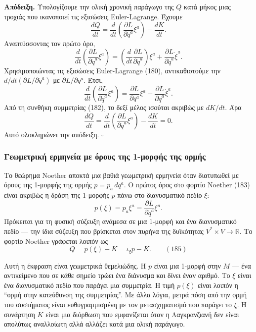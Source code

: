 \documentclass[12pt]{article}
\begin{document}
\textbf{Απόδειξη.} Υπολογίζουμε την ολική χρονική παράγωγο της $Q$ κατά μήκος μιας τροχιάς που ικανοποιεί τις εξισώσεις Euler-Lagrange. Έχουμε
\[
\frac{dQ}{dt} = \frac{d}{dt} \left( \frac{\partial L}{\partial \dot{q}^a} \xi^a \right) - \frac{dK}{dt}.
\]
Αναπτύσσοντας τον πρώτο όρο,
\[
\frac{d}{dt} \left( \frac{\partial L}{\partial \dot{q}^a} \xi^a \right) = \left( \frac{d}{dt} \frac{\partial L}{\partial \dot{q}^a} \right) \xi^a + \frac{\partial L}{\partial \dot{q}^a} \dot{\xi}^a.
\]
Χρησιμοποιώντας τις εξισώσεις Euler-Lagrange (180), αντικαθιστούμε την $d/dt (\partial L / \partial \dot{q}^a)$ με $\partial L / \partial q^a$. Έτσι,
\[
\frac{d}{dt} \left( \frac{\partial L}{\partial \dot{q}^a} \xi^a \right) = \frac{\partial L}{\partial q^a} \xi^a + \frac{\partial L}{\partial \dot{q}^a} \dot{\xi}^a.
\]
Από τη συνθήκη συμμετρίας (182), το δεξί μέλος ισούται ακριβώς με $dK/dt$. Άρα
\[
\frac{dQ}{dt} = \frac{d}{dt} \left( \frac{\partial L}{\partial \dot{q}^a} \xi^a \right) - \frac{dK}{dt} = 0.
\]
Αυτό ολοκληρώνει την απόδειξη. $\square$

\subsubsection{Γεωμετρική ερμηνεία με όρους της 1-μορφής της ορμής}

Το θεώρημα Noether αποκτά μια βαθιά γεωμετρική ερμηνεία όταν διατυπωθεί με όρους της 1-μορφής της ορμής $p = p_a \, dq^a$. Ο πρώτος όρος στο φορτίο Noether (183) είναι ακριβώς η δράση της 1-μορφής $p$ πάνω στο διανυσματικό πεδίο $\xi$:
\[
p(\xi) = p_a \xi^a = \frac{\partial L}{\partial \dot{q}^a} \xi^a.
\]
Πρόκειται για τη φυσική σύζευξη ανάμεσα σε μια 1-μορφή και ένα διανυσματικό πεδίο — την ίδια σύζευξη που βρίσκεται στον πυρήνα της δυϊκότητας $V^* \times V \to \mathbb{R}$. Το φορτίο Noether γράφεται λοιπόν ως
\begin{equation}
Q = p(\xi) - K = \iota_\xi p - K. \qquad (185)
\end{equation}

Αυτή η έκφραση είναι γεωμετρικά θεμελιώδης. Η $p$ είναι μια 1-μορφή στην $M$ — ένα αντικείμενο που σε κάθε σημείο τρώει ένα διάνυσμα και δίνει έναν αριθμό. Το $\xi$ είναι ένα διανυσματικό πεδίο που παράγει μια συμμετρία. Η τιμή $p(\xi)$ είναι λοιπόν η ``ορμή στην κατεύθυνση της συμμετρίας''. Με άλλα λόγια, μετρά πόση από την ορμή του συστήματος είναι ευθυγραμμισμένη με τον μετασχηματισμό που παράγει το $\xi$. Η συνάρτηση $K$ είναι μια διόρθωση που εμφανίζεται όταν η Λαγκρανζιανή δεν είναι απολύτως αναλλοίωτη αλλά αλλάζει κατά μια ολική παράγωγο.
\end{document}
